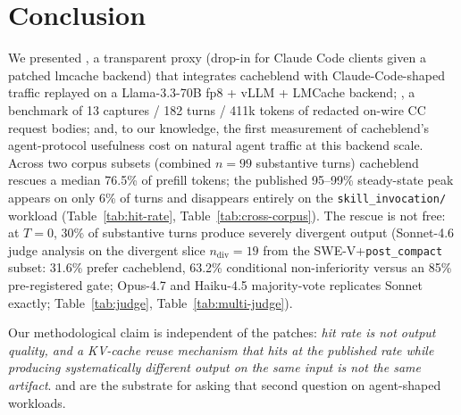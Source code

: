 
\section{Conclusion}
\label{sec:conclusion}

We presented \sys{}, a transparent proxy (drop-in for Claude Code
clients given a patched lmcache backend) that integrates cacheblend
with Claude-Code-shaped traffic replayed on a Llama-3.3-70B fp8 +
vLLM + LMCache backend; \dataset{}, a benchmark of 13 captures /
182 turns / 411k tokens of redacted on-wire CC request bodies; and,
to our knowledge, the first measurement of cacheblend's
agent-protocol usefulness cost on natural agent traffic at this
backend scale. Across two corpus subsets (combined $n{=}99$
substantive turns) cacheblend rescues a median 76.5\% of prefill
tokens; the published 95--99\% steady-state peak appears on only
6\% of turns and disappears entirely on the
\texttt{skill\_invocation/} workload
(Table~\ref{tab:hit-rate}, Table~\ref{tab:cross-corpus}). The rescue
is not free: at $T{=}0$, 30\% of substantive turns produce severely
divergent output (Sonnet-4.6 judge analysis on the divergent slice
$n_{\text{div}}{=}19$ from the SWE-V+\texttt{post\_compact} subset:
31.6\% prefer cacheblend, 63.2\% conditional non-inferiority versus an
85\% pre-registered gate; Opus-4.7 and Haiku-4.5 majority-vote
replicates Sonnet exactly; Table~\ref{tab:judge},
Table~\ref{tab:multi-judge}).

Our methodological claim is independent of the patches:
\emph{hit rate is not output quality, and a KV-cache reuse
mechanism that hits at the published rate while producing
systematically different output on the same input is not the same
artifact}. \sys{} and \dataset{} are the substrate for asking that
second question on agent-shaped workloads.

